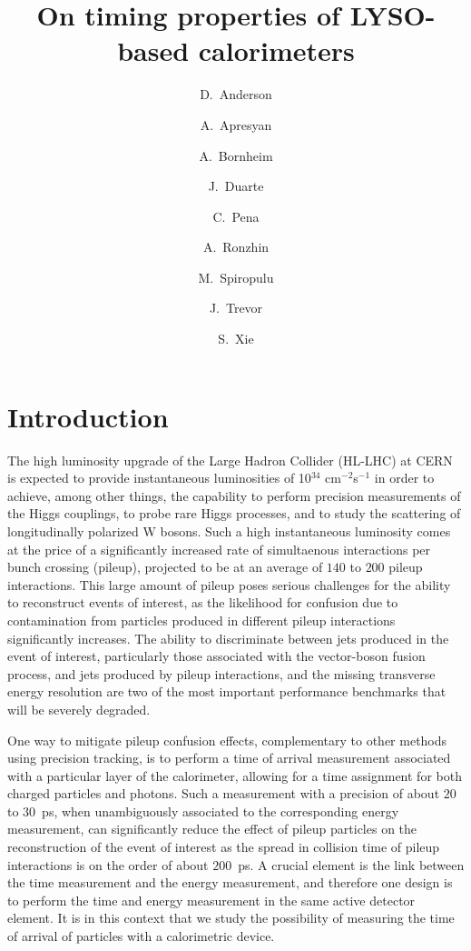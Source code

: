 \documentclass[12pt]{article}
\title{On timing properties of LYSO-based calorimeters}
\author[1]{D.~Anderson}
\author[1]{A.~Apresyan}
\author[1]{A.~Bornheim}
\author[1]{J.~Duarte}
\author[1]{C.~Pena}
\author[2]{A.~Ronzhin}
\author[1]{M.~Spiropulu}
\author[1]{J.~Trevor}
\author[1]{S.~Xie}
\affil[1]{California Institute of Technology, Pasadena, CA, USA}
\affil[2]{Fermi National Accelerator Laboratory, Batavia, IL, USA}
\date{}
\begin{document}
\maketitle
{}



\section{Introduction}

The high luminosity upgrade of the Large Hadron Collider (HL-LHC) at CERN~\cite{Rossi:1471000}
is expected to provide instantaneous luminosities of 10$^{34}$ cm$^{-2}$s$^{-1}$
in order to achieve, among other things, the capability to perform precision 
measurements of the Higgs couplings, to probe rare Higgs processes,
and to study the scattering of longitudinally polarized W bosons. Such a
high instantaneous luminosity comes at the price of a significantly increased
rate of simultaenous interactions per bunch crossing (pileup), 
projected to be at an average of $140$ to $200$ pileup
interactions. This large amount of pileup poses serious
challenges for the ability to reconstruct events of interest, as the 
likelihood for confusion due to contamination from particles produced
in different pileup interactions significantly increases. The ability to
discriminate between jets produced in the event of interest,
particularly those associated with the vector-boson fusion process,
and jets produced by pileup interactions, and the missing transverse energy
resolution are two of the most important performance benchmarks
that will be severely degraded.

One way to mitigate pileup confusion effects,
complementary to other methods using precision tracking,
is to perform a time of arrival measurement associated with a
particular layer of the calorimeter, allowing for a time
assignment for both charged particles and photons. Such a measurement
with a precision of about $20$ to $30$~ps, when unambiguously
associated to the corresponding energy measurement, can significantly reduce
the effect of pileup particles on the reconstruction of the
event of interest as the spread in collision time of pileup interactions
is on the order of about $200$~ps. A crucial element is
the link between the time measurement and the energy measurement,
and therefore one design is to perform the time and energy
measurement in the same active detector element. It is in this context 
that we study the possibility of measuring the time of arrival of 
particles with a calorimetric device.
\end{document}
